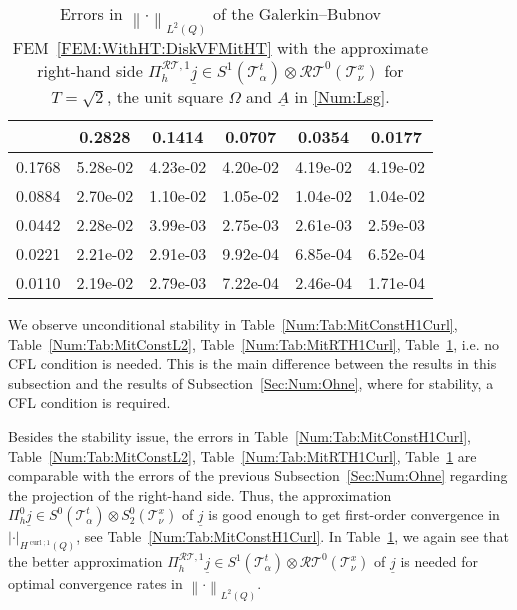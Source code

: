 \documentclass[a4paper,11pt]{article}
\newcommand{\cu}{\operatorname{curl}}
\renewcommand{\vec}[1]{\underline{#1}}
\newcommand{\abs}[1]{\left\lvert{#1}\right\rvert}
\newcommand{\norm}[1]{{\left\lVert{#1}\right\rVert}}
\begin{document}
\begin{table}[ht!]
	\begin{center}
		\begin{footnotesize}\begin{tabular}{r||c|c|c|c|c}
				\diagbox{$h_x$}{\vspace*{-.1cm}$h_t$} & 0.2828 & 0.1414 & 0.0707 & 0.0354 & 0.0177   \\
				\hline\hline
				0.1768 & 5.28e-02 & 4.23e-02 & 4.20e-02 & 4.19e-02 & 4.19e-02 \\
				0.0884 & 2.70e-02 & 1.10e-02 & 1.05e-02 & 1.04e-02 & 1.04e-02 \\
				0.0442 & 2.28e-02 & 3.99e-03 & 2.75e-03 & 2.61e-03 & 2.59e-03 \\
				0.0221 & 2.21e-02 & 2.91e-03 & 9.92e-04 & 6.85e-04 & 6.52e-04 \\
				0.0110 & 2.19e-02 & 2.79e-03 & 7.22e-04 & 2.46e-04 & 1.71e-04
		\end{tabular}\end{footnotesize}
		\caption{Errors in $\norm{\cdot}_{L^2(Q)}$ of the Galerkin--Bubnov FEM~\eqref{FEM:WithHT:DiskVFMitHT} with the approximate right-hand side $\Pi_h^{\mathcal{RT},1} \vec j \in S^1(\mathcal T^t_\alpha) \otimes \mathcal{RT}^0(\mathcal T^x_\nu)$ for $T=\sqrt{2}$, the unit square $\Omega$ and $\vec A$ in \eqref{Num:Lsg}.} \label{Num:Tab:MitRTL2}
	\end{center}
\end{table}

We observe unconditional stability in Table~\ref{Num:Tab:MitConstH1Curl}, Table~\ref{Num:Tab:MitConstL2}, Table~\ref{Num:Tab:MitRTH1Curl}, Table~\ref{Num:Tab:MitRTL2}, i.e. no CFL condition is needed. This is the main difference between the results in this subsection and the results of Subsection~\ref{Sec:Num:Ohne}, where for stability, a CFL condition is required.

Besides the stability issue, the errors in Table~\ref{Num:Tab:MitConstH1Curl}, Table~\ref{Num:Tab:MitConstL2}, Table~\ref{Num:Tab:MitRTH1Curl}, Table~\ref{Num:Tab:MitRTL2} are comparable with the errors of the previous Subsection~\ref{Sec:Num:Ohne} regarding the projection of the right-hand side. Thus, the approximation $\Pi_h^0 \vec j \in S^0(\mathcal T^t_\alpha) \otimes S_2^0(\mathcal T^x_\nu)$ of $\vec j$ is good enough to get first-order convergence in $\abs{\cdot}_{H^{\cu;1}(Q)}$, see Table~\ref{Num:Tab:MitConstH1Curl}. In Table~\ref{Num:Tab:MitRTL2}, we  again see that the better approximation $\Pi_h^{\mathcal{RT},1} \vec j \in S^1(\mathcal T^t_\alpha) \otimes \mathcal{RT}^0(\mathcal T^x_\nu)$ of $\vec j$ is needed for optimal convergence rates in $\norm{\cdot}_{L^2(Q)}.$
\end{document}
